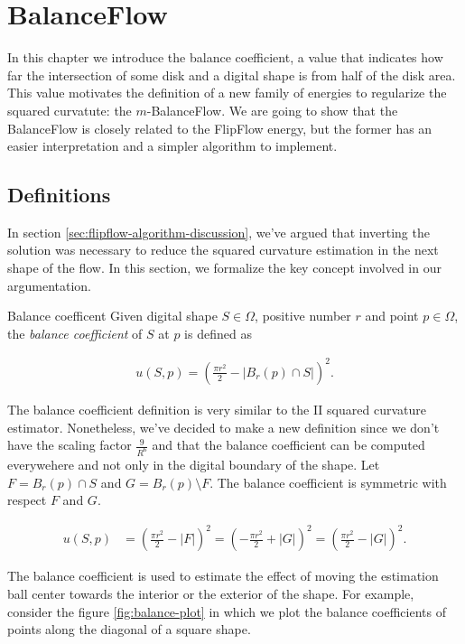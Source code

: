 \chapter{BalanceFlow}
\label{chapter:balance-flow}


In this chapter we introduce the balance coefficient, a value that indicates how far the intersection of some disk and a digital shape is from half of the disk area. This value motivates the definition of a new family of energies to regularize the squared curvatute: the $m$-BalanceFlow. We are going to show that the BalanceFlow is closely related to the FlipFlow energy, but the former has an easier interpretation and a simpler algorithm to implement.


\section{Definitions}
In section \ref{sec:flipflow-algorithm-discussion}, we've argued that inverting the solution was necessary to reduce the squared curvature estimation in the next shape of the flow. In this section, we formalize the key concept involved in our argumentation.

\begin{definition}{Balance coefficent}
Given digital shape $S \in \Omega$, positive number $r$ and point $p \in \Omega$, the \emph{balance coefficient} of $S$ at $p$ is defined as

\begin{align*}
	u(S,p) = ( \frac{\pi r^2}{2} - |B_r(p) \cap S| )^2.
\end{align*}

\end{definition}

The balance coefficient definition is very similar to the II squared curvature estimator. Nonetheless, we've decided to make a new definition since we don't have the scaling factor $\frac{9}{R^6}$ and that the balance coefficient can be computed everywehere and not only in the digital boundary of the shape. Let $F=B_r(p) \cap S$ and $G=B_r(p) \setminus F$. The balance coefficient is symmetric with respect $F$ and $G$. 

\begin{align*}
	u(S,p) &= ( \frac{\pi r^2}{2} - |F| )^2 = ( -\frac{\pi r^2}{2} + |G| )^2 = ( \frac{\pi r^2}{2} - |G| )^2.
\end{align*}

The balance coefficient is used to estimate the effect of moving the estimation ball center towards the interior or the exterior of the shape. For example, consider the figure \ref{fig:balance-plot} in which we plot the balance coefficients of points along the diagonal of a square shape. 

